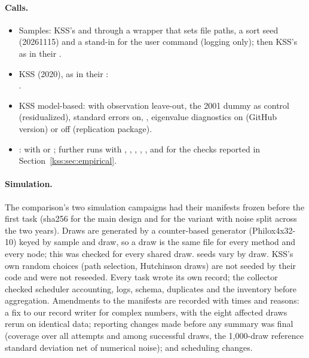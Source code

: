 \paragraph{Calls.}
\begin{itemize}
\item Samples: KSS's  and  through a wrapper that sets file paths, a sort seed
(20261115) and a stand-in for the user command  (logging only); then KSS's  as in
their .
\item KSS (2020), as in their :\\
{\footnotesize{}}.
\item KSS model-based:  with observation leave-out, the 2001 dummy as control
(residualized), standard errors on, , eigenvalue diagnostics on (GitHub version) or
off (replication package).
\item \fevc:  with
 or ; further runs with ,
, , , ,
 and  for the checks reported in Section~\ref{kss:sec:empirical}.
\end{itemize}

\paragraph{Simulation.} The comparison's two simulation campaigns had their manifests frozen before the first
task (sha256  for the main design and  for the variant with noise split
across the two years). Draws are generated by a counter-based generator (Philox4x32-10)
keyed by sample and draw, so a draw is the same file for every method and every node; this was checked for every
shared draw. \fevc{} seeds vary by draw. KSS's own random choices (path selection, Hutchinson draws) are not
seeded by their code and were not reseeded. Every task wrote its own record; the collector checked scheduler
accounting, logs, schema, duplicates and the inventory before aggregation. Amendments to the manifests are
recorded with times and reasons: a fix to our record writer for complex numbers, with the eight affected draws
rerun on identical data; reporting changes made before any summary was final (coverage over all attempts and
among successful draws, the 1{,}000-draw reference standard deviation net of numerical noise); and scheduling
changes.
